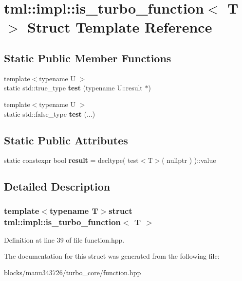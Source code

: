 \hypertarget{structtml_1_1impl_1_1is__turbo__function}{\section{tml\+:\+:impl\+:\+:is\+\_\+turbo\+\_\+function$<$ T $>$ Struct Template Reference}
\label{structtml_1_1impl_1_1is__turbo__function}
}
\subsection*{Static Public Member Functions}
\begin{DoxyCompactItemize}
\item 
\hypertarget{structtml_1_1impl_1_1is__turbo__function_a080908c6ec87239783ef06ef5f7b094f}{{\footnotesize template$<$typename U $>$ }\\static std\+::true\+\_\+type {\bfseries test} (typename U\+::result $\ast$)}\label{structtml_1_1impl_1_1is__turbo__function_a080908c6ec87239783ef06ef5f7b094f}

\item 
\hypertarget{structtml_1_1impl_1_1is__turbo__function_adb46a6d1b25b0f6887450346229ba2a4}{{\footnotesize template$<$typename U $>$ }\\static std\+::false\+\_\+type {\bfseries test} (...)}\label{structtml_1_1impl_1_1is__turbo__function_adb46a6d1b25b0f6887450346229ba2a4}

\end{DoxyCompactItemize}
\subsection*{Static Public Attributes}
\begin{DoxyCompactItemize}
\item 
\hypertarget{structtml_1_1impl_1_1is__turbo__function_af755537c2c24fa8c90ae0cd3f13c1fbd}{static constexpr bool {\bfseries result} = decltype( test$<$T$>$( nullptr ) )\+::value}\label{structtml_1_1impl_1_1is__turbo__function_af755537c2c24fa8c90ae0cd3f13c1fbd}

\end{DoxyCompactItemize}


\subsection{Detailed Description}
\subsubsection*{template$<$typename T$>$struct tml\+::impl\+::is\+\_\+turbo\+\_\+function$<$ T $>$}



Definition at line 39 of file function.\+hpp.



The documentation for this struct was generated from the following file\+:\begin{DoxyCompactItemize}
\item 
blocks/manu343726/turbo\+\_\+core/function.\+hpp\end{DoxyCompactItemize}
